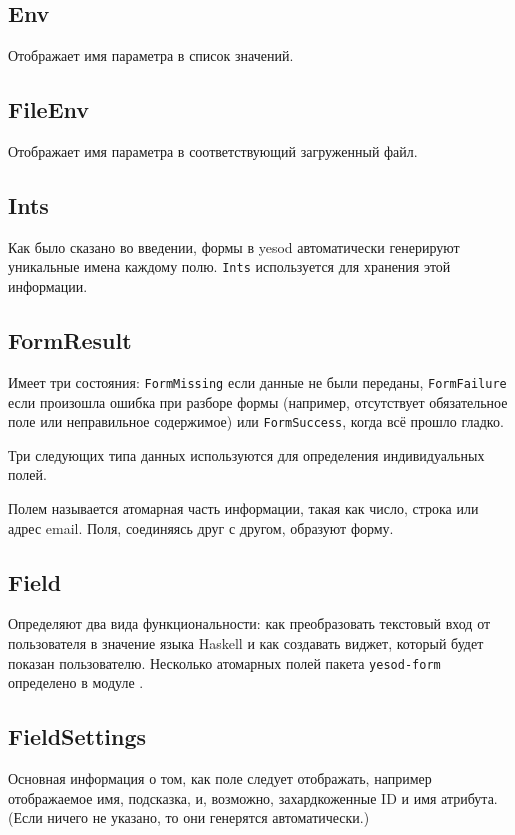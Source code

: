 \subsection{Env}
Отображает имя параметра в список значений.

\subsection{FileEnv}
Отображает имя параметра в соответствующий загруженный файл.

\subsection{Ints}
Как было сказано во введении, формы в yesod автоматически генерируют уникальные имена 
каждому полю. \lstinline'Ints' используется для хранения этой информации.

\subsection{FormResult}
Имеет три состояния: \lstinline'FormMissing' если данные не были переданы,
\lstinline'FormFailure' если произошла ошибка при разборе формы (например, отсутствует
обязательное поле или неправильное содержимое) или \lstinline'FormSuccess', когда всё прошло
гладко.

Три следующих типа данных используются для определения индивидуальных
 полей.

\begin{remark}
Полем называется атомарная часть информации, такая как число, строка или адрес
email. Поля, соединяясь друг с другом, образуют форму.
\end{remark}

\subsection{Field}
Определяют два вида функциональности: как преобразовать текстовый вход от пользователя 
в значение языка Haskell и как создавать виджет, который будет показан пользователю.
Несколько атомарных полей пакета \lstinline'yesod-form' определено в модуле
 .

\subsection{FieldSettings}
Основная информация о том, как поле следует отображать, например отображаемое имя,
подсказка, и, возможно, захардкоженные ID и имя атрибута. (Если ничего не указано, то они
генерятся автоматически.)

